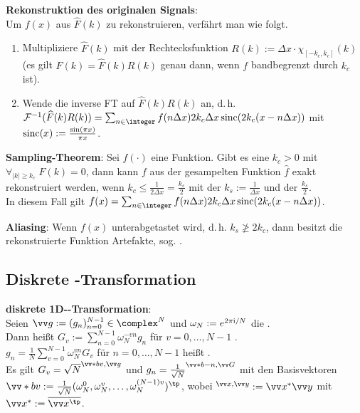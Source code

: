 \textbf{Rekonstruktion des originalen Signals}:\\
Um $f(x)$ aus $\widehat{F}(k)$ zu rekonstruieren, verfährt man wie folgt.
\begin{enumerate}
    \item
    Multipliziere $\widehat{F}(k)$ mit der Rechtecksfunktion
    $R(k) := \Delta x \cdot \chi_{[-k_c,k_c]}(k)$\\
    (es gilt $F(k) = \widehat{F}(k) R(k)$ genau dann, wenn $f$ bandbegrenzt durch $k_c$ ist).

    \item
    Wende die inverse FT auf $\widehat{F}(k) R(k)$ an, d.\,h.\\
    $\F^{-1}(\widehat{F}(k) R(k))
    = \sum_{n \in \integer} f(n\Delta x) 2k_c \Delta x \sinc(2k_c (x - n\Delta x))$
    mit $\operatorname{sinc}(x) := \frac{\sin(\pi x)}{\pi x}$.
\end{enumerate}

\textbf{Sampling-Theorem}:
Sei $f(\cdot)$ eine Funktion.
Gibt es eine  $k_c > 0$
mit $\forall_{|k| \ge k_c}\; F(k) = 0$, dann kann $f$ aus der
gesampelten Funktion $\widehat{f}$ exakt rekonstruiert werden,
wenn $k_c \le \frac{1}{2 \Delta x} = \frac{k_s}{2}$
mit der  $k_s := \frac{1}{\Delta x}$ und
der  $\frac{k_s}{2}$.\\
In diesem Fall gilt
$f(x) = \sum_{n \in \integer} f(n\Delta x) 2k_c \Delta x \sinc(2k_c (x - n\Delta x))$.

\textbf{Aliasing}:
Wenn $f(x)$ unterabgetastet wird, d.\,h. $k_s \not\ge 2k_c$,
dann besitzt die rekonstruierte Funktion Artefakte, sog. .

\subsection{%
    Diskrete -Transformation%
}

\textbf{diskrete 1D--Transformation}:\\
Seien $\vec{g} := (g_n)_{n=0}^{N-1} \in \complex^N$
und $\omega_N := e^{2\pi\text{i}/N}$ die .\\
Dann heißt
$G_v := \sum_{n=0}^{N-1} \omega_N^{-vn} g_n$ für $v = 0, \dotsc, N - 1$
.\\
$g_n = \frac{1}{N} \sum_{v=0}^{N-1} \omega_N^{vn} G_v$ für $n = 0, \dotsc, N - 1$
heißt .\\
Es gilt $G_v = \sqrt{N} \sp{\vec*{b}{v}, \vec{g}}$
und $g_n = \frac{1}{\sqrt{N}} \sp{\vec*{b}{-n}, \vec{G}}$ mit den Basisvektoren\\
$\vec*{b}{v} := \frac{1}{\sqrt{N}}
(\omega_N^0, \omega_N^{v}, \dotsc, \omega_N^{(N-1)v})^\tp$,
wobei $\sp{\vec{x}, \vec{y}} := \vec{x}^\ast \vec{y}$ mit
$\vec{x}^\ast := \overline{\vec{x}^\tp}$.

